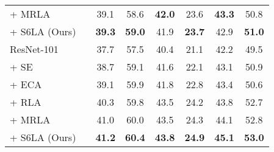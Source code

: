 \begin{table}[t]
\begin{center}
{\begin{tabular}{l|c|cccccc}
    + MRLA \citep{fang2023cross} & & 39.1 & 58.6 & \textbf{42.0} & 23.6 & \textbf{43.3} & 50.8 \\
    + S6LA (Ours) & & \textbf{39.3} & \textbf{59.0} & 41.9 & \textbf{23.7} & 42.9 & \textbf{51.0} \\
    \cmidrule(lr){1-1} \cmidrule(lr){3-8}
    ResNet-101 \citep{he2016deep} &  & 37.7 &57.5& 40.4& 21.1 & 42.2& 49.5 \\
    + SE \citep{hu2018squeeze} & & 38.7 &59.1 &41.6 &22.1 &43.1 &50.9 \\
    + ECA \citep{wang2020eca} & & 39.1 & 59.9 & 41.8 & 22.8 & 43.4 & 50.6 \\
    + RLA \citep{zhao2021recurrence} & & 40.3 & 59.8 & 43.5& 24.2 &43.8 &52.7 \\
    + MRLA \citep{fang2023cross} & & 41.0 & 60.0 & 43.5 & 24.3& 44.1 & 52.8 \\
    + S6LA (Ours) & & \textbf{41.2} & \textbf{60.4} & \textbf{43.8} & \textbf{24.9} & \textbf{45.1} & \textbf{53.0} \\
    \bottomrule
\end{tabular}
}
\end{center}
\vspace{-0.8cm}
\end{table}

